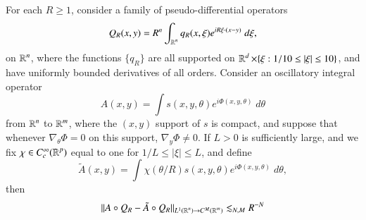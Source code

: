 \begin{lemma} \label{lemma:WaveOscillatoryLemmaddw}
  For each $R \geq 1$, consider a family of pseudo-differential operators 
  \[ Q_R(x,y) = R^n \int_{\operatorname{\mathbb{R}}^n} q_R(x, \xi) e^{i R \xi \cdot (x - y)}\; d\xi, \]
  on $\operatorname{\mathbb{R}}^n$, where the functions $\{ q_R \}$ are all supported on $\operatorname{\mathbb{R}}^d \times \{ \xi: 1/10 \leq |\xi| \leq 10 \}$, and have uniformly bounded derivatives of all orders. Consider an oscillatory integral operator
  \[ A(x,y) = \int s(x,y,\theta) e^{i \Phi(x,y,\theta)}\; d\theta \]
  from $\operatorname{\mathbb{R}}^n$ to $\operatorname{\mathbb{R}}^m$, where the $(x,y)$ support of $s$ is compact, and suppose that whenever $\nabla_\theta \Phi = 0$ on this support, $\nabla_y \Phi \neq 0$. If $L > 0$ is sufficiently large, and we fix $\chi \in C_c^\infty(\operatorname{\mathbb{R}}^p)$ equal to one for $1/L \leq |\xi| \leq L$, and define
  \[ \tilde{A}(x,y) = \int \chi( \theta / R ) s(x,y,\theta) e^{i \Phi(x,y,\theta)}\; d\theta, \]
  then
  \[ \| A \circ Q_R - \tilde{A} \circ Q_R \|_{L^1(\operatorname{\mathbb{R}}^n) \to C^M(\operatorname{\mathbb{R}}^m)} \lesssim_{N,M} R^{-N} \]
\end{lemma}
